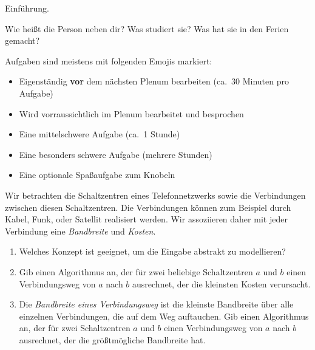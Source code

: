 \documentclass{uebung_cs}
\begin{document}
\begin{exercise}[Kennenlernen I][\atschool]
  Einführung.
\end{exercise}

\begin{exercise}[Kennenlernen II][\atschool]
  Wie heißt die Person neben dir?
  Was studiert sie?
  Was hat sie in den Ferien gemacht?
\end{exercise}

\begin{exercise}
  Aufgaben sind meistens mit folgenden Emojis markiert:
  \begin{itemize}
    \item[\athome] Eigenständig \textbf{vor} dem nächsten Plenum bearbeiten (ca.~30 Minuten pro Aufgabe)
    \item[\atschool] Wird vorraussichtlich im Plenum bearbeitet und besprochen
    \item[\mittel] Eine mittelschwere Aufgabe (ca.~1 Stunde)
    \item[\note] Eine besonders schwere Aufgabe (mehrere Stunden)
    \item[\spass] Eine optionale Spaßaufgabe zum Knobeln
  \end{itemize}
\end{exercise}

\begin{exercise}[Telefonnetzwerk][\atschool\mittel]
  Wir betrachten die Schaltzentren eines Telefonnetzwerks sowie die Verbindungen zwischen diesen Schaltzentren.
  Die Verbindungen können zum Beispiel durch Kabel, Funk, oder Satellit realisiert werden.
  Wir assoziieren daher mit jeder Verbindung eine \emph{Bandbreite} und \emph{Kosten}.
  \begin{enumerate}
    \item Welches Konzept ist geeignet, um die Eingabe abstrakt zu modellieren?
    \item Gib einen Algorithmus an, der für zwei beliebige Schaltzentren $a$ und $b$ einen Verbindungsweg von $a$ nach $b$ ausrechnet, der die kleinsten Kosten verursacht.
    \item Die \emph{Bandbreite eines Verbindungsweg} ist die kleinste Bandbreite über alle einzelnen Verbindungen, die auf dem Weg auftauchen.
    Gib einen Algorithmus an, der für zwei Schaltzentren $a$ und $b$ einen Verbindungsweg von $a$ nach $b$ ausrechnet, der die größtmögliche Bandbreite hat.
  \end{enumerate}
\end{exercise}
\end{document}
